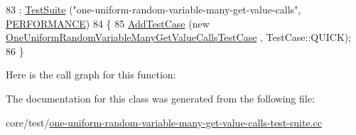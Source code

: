\begin{DoxyCode}
83   : \hyperlink{classns3_1_1TestSuite_a904b0c40583b744d30908aeb94636d1a}{TestSuite} (\textcolor{stringliteral}{"one-uniform-random-variable-many-get-value-calls"}, 
      \hyperlink{classns3_1_1TestSuite_a1ebfcab34ec8161e085e8e3a1855eae0a0d439cead7625e5ab851a783a72ada84}{PERFORMANCE})
84 \{
85   \hyperlink{classns3_1_1TestCase_a3718088e3eefd5d6454569d2e0ddd835}{AddTestCase} (\textcolor{keyword}{new} \hyperlink{classOneUniformRandomVariableManyGetValueCallsTestCase}{OneUniformRandomVariableManyGetValueCallsTestCase}
      , TestCase::QUICK);
86 \}
\end{DoxyCode}


Here is the call graph for this function\+:




The documentation for this class was generated from the following file\+:\begin{DoxyCompactItemize}
\item 
core/test/\hyperlink{one-uniform-random-variable-many-get-value-calls-test-suite_8cc}{one-\/uniform-\/random-\/variable-\/many-\/get-\/value-\/calls-\/test-\/suite.\+cc}\end{DoxyCompactItemize}
